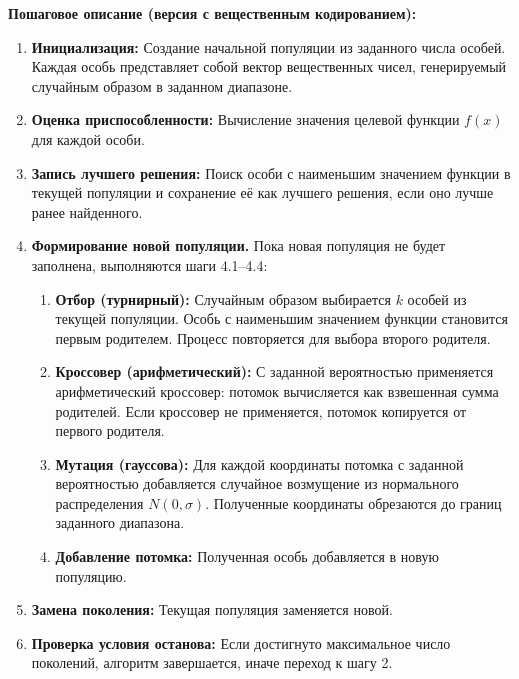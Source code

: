 \documentclass[12pt,a4paper]{article}
\begin{document}
\textbf{Пошаговое описание (версия с вещественным кодированием):}
\begin{enumerate}
    \item \textbf{Инициализация:} Создание начальной популяции из заданного числа особей. Каждая особь представляет собой вектор вещественных чисел, генерируемый случайным образом в заданном диапазоне.
    \item \textbf{Оценка приспособленности:} Вычисление значения целевой функции \(f(x)\) для каждой особи.
    \item \textbf{Запись лучшего решения:} Поиск особи с наименьшим значением функции в текущей популяции и сохранение её как лучшего решения, если оно лучше ранее найденного.
    \item \textbf{Формирование новой популяции.} Пока новая популяция не будет заполнена, выполняются шаги 4.1--4.4:
        \begin{enumerate}
            \item \textbf{Отбор (турнирный):} Случайным образом выбирается \(k\) особей из текущей популяции. Особь с наименьшим значением функции становится первым родителем. Процесс повторяется для выбора второго родителя.
            \item \textbf{Кроссовер (арифметический):} С заданной вероятностью применяется арифметический кроссовер: потомок вычисляется как взвешенная сумма родителей. Если кроссовер не применяется, потомок копируется от первого родителя.
            \item \textbf{Мутация (гауссова):} Для каждой координаты потомка с заданной вероятностью добавляется случайное возмущение из нормального распределения \(N(0, \sigma)\). Полученные координаты обрезаются до границ заданного диапазона.
            \item \textbf{Добавление потомка:} Полученная особь добавляется в новую популяцию.
        \end{enumerate}
    \item \textbf{Замена поколения:} Текущая популяция заменяется новой.
    \item \textbf{Проверка условия останова:} Если достигнуто максимальное число поколений, алгоритм завершается, иначе переход к шагу 2.
\end{enumerate}
\end{document}
